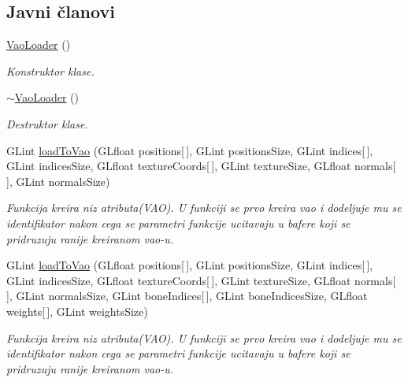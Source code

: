 \subsection*{Javni članovi}
\begin{DoxyCompactItemize}
\item 
\hyperlink{classcore_1_1VaoLoader_ab025be7312c274b9737b19d308bd5845}{Vao\+Loader} ()
\begin{DoxyCompactList}\small\item\em Konstruktor klase. \end{DoxyCompactList}\item 
\hyperlink{classcore_1_1VaoLoader_a1b522bb4b83dbe751783fee04ac712d3}{$\sim$\+Vao\+Loader} ()
\begin{DoxyCompactList}\small\item\em Destruktor klase. \end{DoxyCompactList}\item 
G\+Lint \hyperlink{classcore_1_1VaoLoader_a66f6bd69acb88c9eb8ff73353d3b5312}{load\+To\+Vao} (G\+Lfloat positions\mbox{[}$\,$\mbox{]}, G\+Lint positions\+Size, G\+Lint indices\mbox{[}$\,$\mbox{]}, G\+Lint indices\+Size, G\+Lfloat texture\+Coords\mbox{[}$\,$\mbox{]}, G\+Lint texture\+Size, G\+Lfloat normals\mbox{[}$\,$\mbox{]}, G\+Lint normals\+Size)
\begin{DoxyCompactList}\small\item\em Funkcija kreira niz atributa(\+V\+A\+O). U funkciji se prvo kreira vao i dodeljuje mu se identifikator nakon cega se parametri funkcije ucitavaju u bafere koji se pridruzuju ranije kreiranom vao-\/u. \end{DoxyCompactList}\item 
G\+Lint \hyperlink{classcore_1_1VaoLoader_afca30e4e6537fbc3c03c24f3eb46cfad}{load\+To\+Vao} (G\+Lfloat positions\mbox{[}$\,$\mbox{]}, G\+Lint positions\+Size, G\+Lint indices\mbox{[}$\,$\mbox{]}, G\+Lint indices\+Size, G\+Lfloat texture\+Coords\mbox{[}$\,$\mbox{]}, G\+Lint texture\+Size, G\+Lfloat normals\mbox{[}$\,$\mbox{]}, G\+Lint normals\+Size, G\+Lint bone\+Indices\mbox{[}$\,$\mbox{]}, G\+Lint bone\+Indices\+Size, G\+Lfloat weights\mbox{[}$\,$\mbox{]}, G\+Lint weights\+Size)
\begin{DoxyCompactList}\small\item\em Funkcija kreira niz atributa(\+V\+A\+O). U funkciji se prvo kreira vao i dodeljuje mu se identifikator nakon cega se parametri funkcije ucitavaju u bafere koji se pridruzuju ranije kreiranom vao-\/u. \end{DoxyCompactList}\item 

\end{DoxyCompactItemize}
